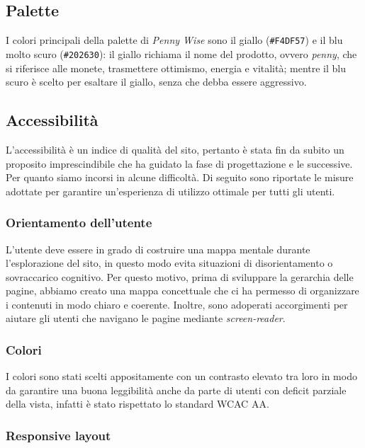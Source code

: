 \subsection{Palette}

I colori principali della palette di \textit{Penny Wise} sono il giallo 
(\texttt{\#F4DF57}) e il blu molto scuro (\texttt{\#202630}): il giallo richiama 
il nome del prodotto, ovvero \textit{penny}, che si riferisce alle monete, 
trasmettere ottimismo, energia e vitalità; mentre il blu scuro è scelto per 
esaltare il giallo, senza che debba essere aggressivo.

\subsection{Accessibilità}

L'accessibilità è un indice di qualità del sito, pertanto è stata fin da subito
un proposito imprescindibile che ha guidato la fase di progettazione e le
successive. Per quanto siamo incorsi in alcune difficoltà. Di seguito sono
riportate le misure adottate per garantire un'esperienza di utilizzo ottimale
per tutti gli utenti.

\subsubsection{Orientamento dell'utente}

L'utente deve essere in grado di costruire una mappa mentale durante
l'esplorazione del sito, in questo modo evita situazioni di disorientamento o
sovraccarico cognitivo. Per questo motivo, prima di sviluppare la gerarchia
delle pagine, abbiamo creato una mappa concettuale che ci ha permesso di 
organizzare i contenuti in modo chiaro e coerente. Inoltre, sono adoperati
accorgimenti per aiutare gli utenti che navigano le pagine mediante
\textit{screen-reader}.

\subsubsection{Colori}

I colori sono stati scelti appositamente con un contrasto elevato tra loro in
modo da garantire una buona leggibilità anche da parte di utenti con deficit
parziale della vista, infatti è stato rispettato lo standard WCAC AA.

\subsubsection{Responsive layout}

